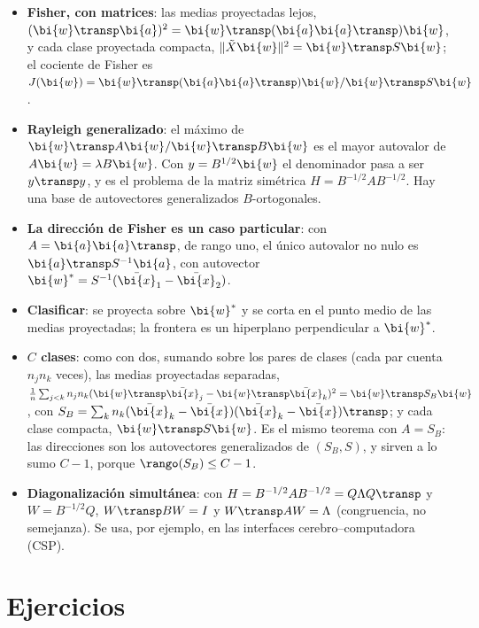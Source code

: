 \begin{ideas}[frametitle={Ideas clave},frametitlefont=\bfseries\large,frametitlebelowskip=4pt]
\begin{itemize}[leftmargin=*,itemsep=2pt]
\item \textbf{Fisher, con matrices}: las medias proyectadas lejos,
$(\bi{w}\transp \bi{a})^2=\bi{w}\transp(\bi{a}\bi{a}\transp)\bi{w}$, y cada clase proyectada compacta,
$\|\tilde X\bi{w}\|^2=\bi{w}\transp S\bi{w}$; el cociente de Fisher es
$J(\bi{w})=\bi{w}\transp(\bi{a}\bi{a}\transp)\bi{w}/\bi{w}\transp S\bi{w}$.
\item \textbf{Rayleigh generalizado}: el máximo de $\bi{w}\transp A\bi{w}/\bi{w}\transp B\bi{w}$ es
el mayor autovalor de $A\bi{w}=\lambda B\bi{w}$. Con $y=B^{1/2}\bi{w}$ el denominador pasa a
ser $y\transp y$, y es el problema de la matriz simétrica
$H=B^{-1/2}AB^{-1/2}$. Hay una base de autovectores generalizados
$B$-ortogonales.
\item \textbf{La dirección de Fisher es un caso particular}: con $A=\bi{a}\bi{a}\transp$,
de rango uno, el único autovalor no nulo es $\bi{a}\transp S^{-1}\bi{a}$, con
autovector $\bi{w}^\ast=S^{-1}(\bar{\bi{x}}_1-\bar{\bi{x}}_2)$.
\item \textbf{Clasificar}: se proyecta sobre $\bi{w}^\ast$ y se corta en el punto
medio de las medias proyectadas; la frontera es un hiperplano perpendicular a
$\bi{w}^\ast$.
\item \textbf{$C$ clases}: como con dos, sumando sobre los pares de clases (cada
par cuenta $n_jn_k$ veces), las medias proyectadas separadas,
$\frac1n\sum_{j<k}n_jn_k(\bi{w}\transp\bar{\bi{x}}_j-\bi{w}\transp\bar{\bi{x}}_k)^2=\bi{w}\transp S_B\bi{w}$, con
$S_B=\sum_kn_k(\bar{\bi{x}}_k-\bar{\bi{x}})(\bar{\bi{x}}_k-\bar{\bi{x}})\transp$; y cada clase compacta,
$\bi{w}\transp S\bi{w}$. Es el mismo teorema con $A=S_B$: las
direcciones son los autovectores generalizados de $(S_B,S)$, y sirven a lo
sumo $C-1$, porque $\rango(S_B)\le C-1$.
\item \textbf{Diagonalización simultánea}: con $H=B^{-1/2}AB^{-1/2}=Q\Lambda Q\transp$
y $W=B^{-1/2}Q$, $W\transp BW=I$ y $W\transp AW=\Lambda$ (congruencia, no
semejanza). Se usa, por ejemplo, en las interfaces
cerebro--computadora (CSP).
\end{itemize}
\end{ideas}

\section*{Ejercicios}


